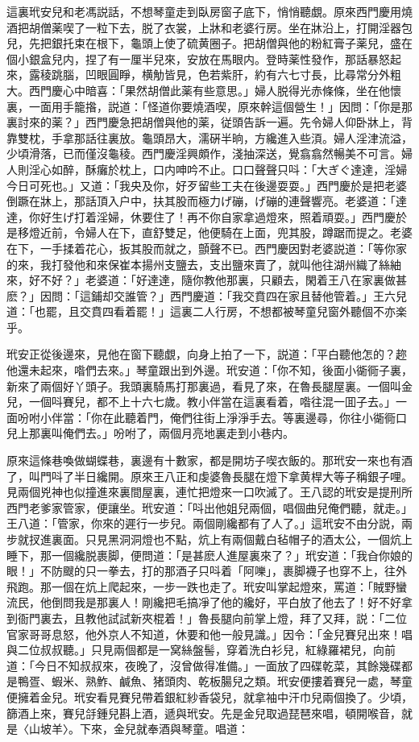 這裏玳安兒和老馮説話，不想琴童走到臥房窗子底下，悄悄聽覷。原來西門慶用燒酒把胡僧薬喫了一粒下去，脱了衣裳，上牀和老婆行房。坐在牀沿上，打開淫器包兒，先把銀托束在根下，龜頭上使了硫黄圈子。把胡僧與他的粉紅膏子薬兒，盛在個小銀盒兒内，捏了有一厘半兒來，安放在馬眼内。登時薬性發作，那話暴怒起來，露稜跳腦，凹眼圓睜，横觔皆見，色若紫肝，約有六七寸長，比尋常分外粗大。西門慶心中暗喜：「果然胡僧此薬有些意思。」婦人脱得光赤條條，坐在他懷裏，一面用手籠揝，説道：「怪道你要燒酒喫，原來幹這個營生！」因問：「你是那裏討來的薬？」西門慶急把胡僧與他的薬，従頭告訴一遍。先令婦人仰卧牀上，背靠雙枕，手拿那話往裏放。龜頭昂大，濡硏半晌，方纔進入些湏。婦人淫津流溢，少頃滑落，已而僅沒龜稜。西門慶淫興頗作，淺抽深送，覺翕翕然暢美不可言。婦人則淫心如醉，酥癱於枕上，口内呻吟不止。口口聲聲只呌：「大ぎぐ達達，淫婦今日可死也。」又道：「我央及你，好歹留些工夫在後邊耍耍。」西門慶於是把老婆倒蹶在牀上，那話頂入户中，扶其股而極力げ磞，げ磞的連聲響亮。老婆道：「達達，你好生げ打着淫婦，休要住了！再不你自家拿過燈來，照着頑耍。」西門慶於是移燈近前，令婦人在下，直舒雙足，他便騎在上面，兜其股，蹲踞而提之。老婆在下，一手揉着花心，扳其股而就之，顫聲不已。西門慶因對老婆説道：「等你家的來，我打發他和來保崔本揚州支鹽去，支出鹽來賣了，就叫他往湖州織了絲紬來，好不好？」老婆道：「好達達，隨你教他那裏，只顧去，閑着王八在家裏做甚麽？」因問：「這鋪却交誰管？」西門慶道：「我交賁四在家且替他管着。」王六兒道：「也罷，且交賁四看着罷！」這裏二人行房，不想都被琴童兒窗外聽個不亦楽乎。

玳安正從後邊來，見他在窗下聽覷，向身上拍了一下，説道：「平白聽他怎的？趂他還未起來，喒們去來。」琴童跟出到外邊。玳安道：「你不知，後面小衚衕子裏，新來了兩個好丫頭子。我頭裏騎馬打那裏過，看見了來，在魯長腿屋裏。一個叫金兒，一個呌賽兒，都不上十六七歲。教小伴當在這裏看着，喒往混一囬子去。」一面吩咐小伴當：「你在此聽着門，俺們往街上淨淨手去。等裏邊尋，你往小衚衕口兒上那裏叫俺們去。」吩咐了，兩個月亮地裏走到小巷内。

原來這條巷喚做蝴蝶巷，裏邊有十數家，都是開坊子喫衣飯的。那玳安一來也有酒了，叫門呌了半日纔開。原來王八正和虔婆魯長腿在燈下拿黄桿大等子稱銀子哩。見兩個兇神也似撞進來裏間屋裏，連忙把燈來一口吹滅了。王八認的玳安是提刑所西門老爹家管家，便讓坐。玳安道：「呌出他姐兒兩個，唱個曲兒俺們聽，就走。」王八道：「管家，你來的遲行一步兒。兩個剛纔都有了人了。」這玳安不由分説，兩步就扠進裏面。只見黑洞洞燈也不點，炕上有兩個戴白毡帽子的酒太公，一個炕上睡下，那一個纔脱裹脚，便問道：「是甚麽人進屋裏來了？」玳安道：「我㒲你娘的眼！」不防颼的只一拳去，打的那酒子只呌着「阿嚛」，裹脚襪子也穿不上，往外飛跑。那一個在炕上爬起來，一步一跌也走了。玳安叫掌起燈來，罵道：「賊野蠻流民，他倒問我是那裏人！剛纔把毛搞凈了他的纔好，平白放了他去了！好不好拿到衙門裏去，且教他試試新夾棍着！」魯長腿向前掌上燈，拜了又拜，説：「二位官家哥哥息怒，他外京人不知道，休要和他一般見識。」因令：「金兒賽兒出來！唱與二位叔叔聽。」只見兩個都是一窝絲盤髻，穿着洗白衫兒，紅綠羅裙兒，向前道：「今日不知叔叔來，夜晚了，沒曾做得准備。」一面放了四碟乾菜，其餘幾碟都是鴨疍、蝦米、熟鮓、鹹魚、猪頭肉、乾板腸兒之類。玳安便摟着賽兒一處，琴童便擁着金兒。玳安看見賽兒帶着銀紅紗香袋兒，就拿袖中汗巾兒兩個換了。少頃，篩酒上來，賽兒㧱鍾兒斟上酒，遞與玳安。先是金兒取過琵琶來唱，頓開喉音，就是〈山坡羊〉。下來，金兒就奉酒與琴童。唱道：

